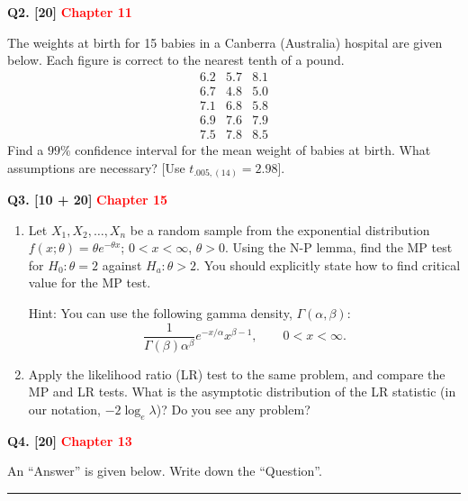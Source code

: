 \documentclass[11pt]{article}
\begin{document}
\bigskip

\textbf{Q2. [20]}  \textbf{\textcolor{red}{Chapter 11}}

The weights at birth for 15 babies in a Canberra (Australia) hospital are given below. Each figure is correct to the nearest tenth of a pound.
\[
\begin{array}{ccc}
6.2 & 5.7 & 8.1 \\
6.7 & 4.8 & 5.0 \\
7.1 & 6.8 & 5.8 \\
6.9 & 7.6 & 7.9 \\
7.5 & 7.8 & 8.5
\end{array}
\]
Find a $99\%$ confidence interval for the mean weight of babies at birth. What assumptions are necessary? [Use $t_{.005,(14)}=2.98$].

\bigskip

\textbf{Q3. [10 + 20]} \textbf{\textcolor{red}{Chapter 15}}

\begin{enumerate}
\setlength{\itemsep}{6pt}\setlength{\parsep}{0pt}\setlength{\topsep}{2pt}
\item[(a)] Let $X_1,X_2,\ldots,X_n$ be a random sample from the exponential distribution $f(x;\theta)=\theta e^{-\theta x}$; $0<x<\infty$, $\theta>0$. Using the N-P lemma, find the MP test for $H_0:\theta=2$ against $H_a:\theta>2$. You should explicitly state how to find critical value for the MP test.

Hint: You can use the following gamma density, $\Gamma(\alpha,\beta)$:
\[
\frac{1}{\Gamma(\beta)\alpha^\beta}e^{-x/\alpha}x^{\beta-1},
\qquad 0<x<\infty.
\]
\item[(b)] Apply the likelihood ratio (LR) test to the same problem, and compare the MP and LR tests. What is the asymptotic distribution of the LR statistic (in our notation, $-2\log_e\lambda$)? Do you see any problem?
\end{enumerate}

\clearpage

\textbf{Q4. [20]}  \textbf{\textcolor{red}{Chapter 13}}

An ``Answer'' is given below. Write down the ``Question''.

\medskip
\hrule
\medskip
\end{document}
